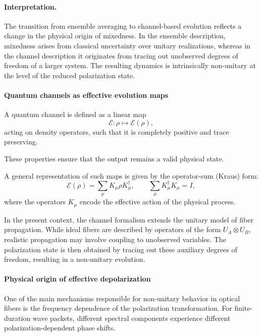 \documentclass[a4paper]{article}
\begin{document}
\medskip

\paragraph{Interpretation.}

The transition from ensemble averaging to channel-based evolution reflects a change in the physical origin of mixedness. In the ensemble description, mixedness arises from classical uncertainty over unitary realizations, whereas in the channel description it originates from tracing out unobserved degrees of freedom of a larger system. The resulting dynamics is intrinsically non-unitary at the level of the reduced polarization state.

\medskip

\paragraph{Quantum channels as effective evolution maps}

A quantum channel is defined as a linear map
\[
\mathcal{E} : \rho \mapsto \mathcal{E}(\rho),
\]
acting on density operators, such that it is completely positive and trace preserving.

These properties ensure that the output remains a valid physical state.

A general representation of such maps is given by the operator-sum (Kraus) form:
\[
\mathcal{E}(\rho)
=
\sum_{\mu} K_{\mu} \rho K_{\mu}^\dagger,
\qquad
\sum_{\mu} K_{\mu}^\dagger K_{\mu} = I,
\]
where the operators \( K_{\mu} \) encode the effective action of the physical process.

\medskip

In the present context, the channel formalism extends the unitary model of fiber propagation. While ideal fibers are described by operators of the form \( U_A \otimes U_B \), realistic propagation may involve coupling to unobserved variables. The polarization state is then obtained by tracing out these auxiliary degrees of freedom, resulting in a non-unitary evolution.

\medskip

\paragraph{Physical origin of effective depolarization}

One of the main mechanisms responsible for non-unitary behavior in optical fibers is the frequency dependence of the polarization transformation. For finite-duration wave packets, different spectral components experience different polarization-dependent phase shifts.
\end{document}
